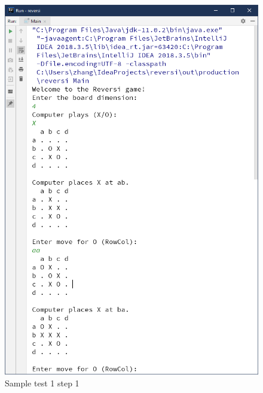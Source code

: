 \documentclass[a4paper]{report}
\begin{document}
\begin{figure}
  \centering
  \includegraphics[width=12cm]{Capture1.png}
  \caption{Sample test 1 step 1}\label{2}
\end{figure}
\end{document}
